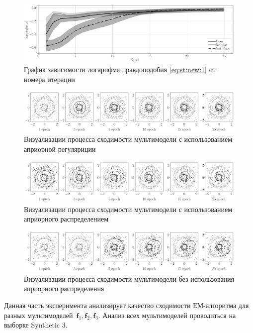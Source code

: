 \begin{figure}[h!t]\center
\includegraphics[width=1\textwidth]{results/priorexpert/experiment_synt_likelihood_progress}
\caption{График зависимости логарифма правдоподобия \eqref{eq:st:new:1} от номера итерации}
\label{experiment:st:2:2}
\end{figure}

\begin{figure}[h!t]\center
\includegraphics[width=1\textwidth]{results/priorexpert/experiment_synt_regular_progress}
\caption{Визуализации процесса сходимости мультимодели с использованием априорной регуляриции}
\label{experiment:st:2:3}
\end{figure}

\begin{figure}[h!t]\center
\includegraphics[width=1\textwidth]{results/priorexpert/experiment_synt_prior_progress}
\caption{Визуализации процесса сходимости мультимодели с использованием априорного распределением}
\label{experiment:st:2:4}
\end{figure}

\begin{figure}[h!t]\center
\includegraphics[width=1\textwidth]{results/priorexpert/experiment_synt_not_prior_progress}
\caption{Визуализации процесса сходимости мультимодели без использования априорного распределения}
\label{experiment:st:2:5}
\end{figure}
Данная часть эксперимента анализирует качество сходимости ЕМ-алгоритма для разных мультимоделей~$\textbf{f}_1, \textbf{f}_2, \textbf{f}_3$.
Анализ всех мультимоделей проводиться на выборке Synthetic 3.

